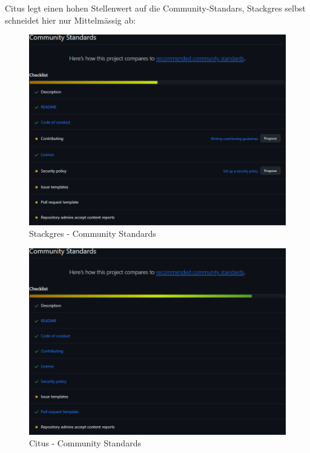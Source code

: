 \begin{flushleft}
    Citus legt einen hohen Stellenwert auf die Community-Standars, Stackgres selbst schneidet hier nur Mittelmässig ab:
    \begin{figure}[H]
        \centering
        \includegraphics[width=0.75\linewidth]{source/implementation/evaluation/postgresql_ha_solutions/insights/stackgres_citus/stackgres_community_standards}
        \caption{Stackgres - Community Standards}
        \label{fig:stackgres_community_standards}
    \end{figure}
    \begin{figure}[H]
        \centering
        \includegraphics[width=0.75\linewidth]{source/implementation/evaluation/postgresql_ha_solutions/insights/stackgres_citus/citus_community_standards}
        \caption{Citus - Community Standards}
        \label{fig:citus_community_standards}
    \end{figure}


\end{flushleft}
